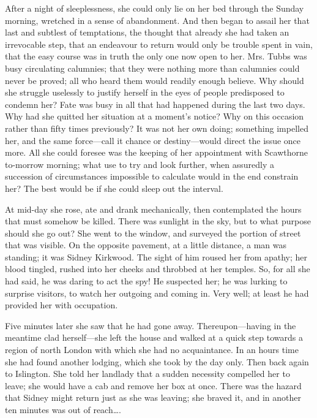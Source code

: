 After a night of sleeplessness, she could only lie on her bed through
the Sunday morning, wretched in a sense of abandonment. And then began
to assail her that last and subtlest of temptations, the thought that
already she had taken an irrevocable {}step, that an endeavour to return
would only be trouble spent in vain, that the easy course was in truth
the only one now open to her. Mrs. Tubbs was busy circulating calumnies;
that they were nothing more than calumnies could never be proved; all
who heard them would readily enough believe. Why should she struggle
uselessly to justify herself in the eyes of people predisposed to
condemn her? Fate was busy in all that had happened during the last two
days. Why had she quitted her situation at a moment's notice? Why on
this occasion rather than fifty times previously? It was not her own
doing; something impelled her, and the same force---call it chance or
destiny---would direct the issue once more. All she could foresee was
the keeping of her appointment with Scawthorne to-morrow morning; what
use to try and look further, when assuredly a succession of
circumstances impossible to calculate would in the end constrain her?
The best would be if she could sleep out the interval.

At mid-day she rose, ate and drank {}mechanically, then contemplated the
hours that must somehow be killed. There was sunlight in the sky, but to
what purpose should she go out? She went to the window, and surveyed the
portion of street that was visible. On the opposite pavement, at a
little distance, a man was standing; it was Sidney Kirkwood. The sight
of him roused her from apathy; her blood tingled, rushed into her cheeks
and throbbed at her temples. So, for all she had said, he was daring to
act the spy! He suspected her; he was lurking to surprise visitors, to
watch her outgoing and coming in. Very well; at least he had provided
her with occupation.

Five minutes later she saw that he had gone away. Thereupon---having in
the meantime clad herself---she left the house and walked at a quick
step towards a region of north London with which she had no
acquaintance. In an hours time she had found another lodging, which she
took by the day only. Then back again to Islington. She told her
landlady that a sudden necessity compelled {}her to leave; she would
have a cab and remove her box at once. There was the hazard that Sidney
might return just as she was leaving; she braved it, and in another ten
minutes was out of reach\ldots{}.

